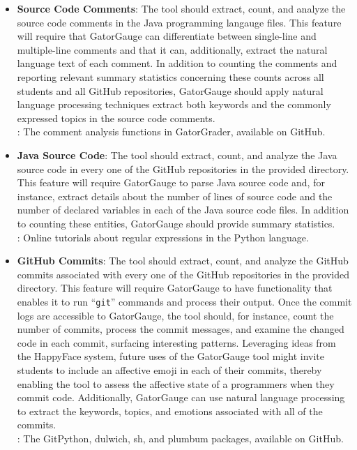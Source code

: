\documentclass[11pt]{article}
\newcommand{\command}[1]{``\lstinline{#1}''}
\begin{document}
\begin{itemize}

  \item {\bf Source Code Comments}: The tool should extract, count, and analyze the source code comments in the Java
    programming langauge files. This feature will require that GatorGauge can differentiate between single-line and
    multiple-line comments and that it can, additionally, extract the natural language text of each comment. In addition
    to counting the comments and reporting relevant summary statistics concerning these counts across all students and
    all GitHub repositories, GatorGauge should apply natural language processing techniques extract both keywords and
    the commonly expressed topics in the source code comments. \\[.5em] : The comment
    analysis functions in GatorGrader, available on GitHub.

  \item {\bf Java Source Code}: The tool should extract, count, and analyze the Java source code in every one of the
    GitHub repositories in the provided directory. This feature will require GatorGauge to parse Java source code and,
    for instance, extract details about the number of lines of source code and the number of declared variables in each
    of the Java source code files. In addition to counting these entities, GatorGauge should provide summary statistics.
    \\[.5em] : Online tutorials about regular expressions in the Python language.

  \item {\bf GitHub Commits}: The tool should extract, count, and analyze the GitHub commits associated with every one
    of the GitHub repositories in the provided directory. This feature will require GatorGauge to have functionality
    that enables it to run \command{git} commands and process their output. Once the commit logs are accessible to
    GatorGauge, the tool should, for instance, count the number of commits, process the commit messages, and examine the
    changed code in each commit, surfacing interesting patterns. Leveraging ideas from the HappyFace system, future uses
    of the GatorGauge tool might invite students to include an affective emoji in each of their commits, thereby
    enabling the tool to assess the affective state of a programmers when they commit code. Additionally, GatorGauge can
    use natural language processing to extract the keywords, topics, and emotions associated with all of the commits. \\[.5em]
    : The GitPython, dulwich, sh, and plumbum packages, available on GitHub.


\end{itemize}
\end{document}
